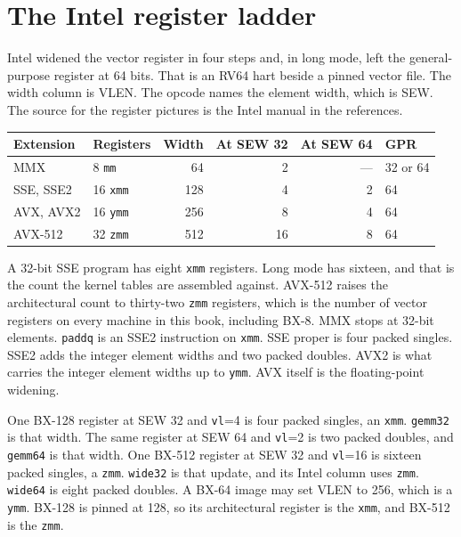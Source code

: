 \section{The Intel register ladder}

Intel widened the vector register in four steps and, in long mode, left the general-purpose register at 64 bits. That is an RV64 hart beside a pinned vector file. The width column is VLEN. The opcode names the element width, which is SEW. The source for the register pictures is the Intel manual in the references.

\begin{center}
\begingroup
\scriptsize
\setlength{\tabcolsep}{4pt}
\begin{tabular}{@{}llrrrl@{}}
\toprule
Extension & Registers & Width & At SEW 32 & At SEW 64 & GPR \\
\midrule
MMX & 8 \texttt{mm} & 64 & 2 & --- & 32 or 64 \\
SSE, SSE2 & 16 \texttt{xmm} & 128 & 4 & 2 & 64 \\
AVX, AVX2 & 16 \texttt{ymm} & 256 & 8 & 4 & 64 \\
AVX-512 & 32 \texttt{zmm} & 512 & 16 & 8 & 64 \\
\bottomrule
\end{tabular}
\endgroup
\end{center}

A 32-bit SSE program has eight \texttt{xmm} registers. Long mode has sixteen, and that is the count the kernel tables are assembled against. AVX-512 raises the architectural count to thirty-two \texttt{zmm} registers, which is the number of vector registers on every machine in this book, including BX-8. MMX stops at 32-bit elements. \texttt{paddq} is an SSE2 instruction on \texttt{xmm}. SSE proper is four packed singles. SSE2 adds the integer element widths and two packed doubles. AVX2 is what carries the integer element widths up to \texttt{ymm}. AVX itself is the floating-point widening.

One BX-128 register at SEW 32 and \texttt{vl}=4 is four packed singles, an \texttt{xmm}. \texttt{gemm32} is that width. The same register at SEW 64 and \texttt{vl}=2 is two packed doubles, and \texttt{gemm64} is that width. One BX-512 register at SEW 32 and \texttt{vl}=16 is sixteen packed singles, a \texttt{zmm}. \texttt{wide32} is that update, and its Intel column uses \texttt{zmm}. \texttt{wide64} is eight packed doubles. A BX-64 image may set VLEN to 256, which is a \texttt{ymm}. BX-128 is pinned at 128, so its architectural register is the \texttt{xmm}, and BX-512 is the \texttt{zmm}.

